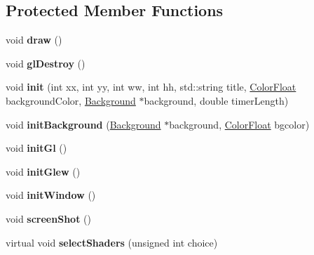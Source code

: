 \subsection*{Protected Member Functions}
\begin{DoxyCompactItemize}
\item 
\mbox{\label{classtsgl_1_1_canvas_af8fd44003f7a8e5cba084ac2a326a7f9}} 
void {\bfseries draw} ()
\item 
\mbox{\label{classtsgl_1_1_canvas_a20304b6428fbe7e163e0a001ea4fdd15}} 
void {\bfseries gl\+Destroy} ()
\item 
\mbox{\label{classtsgl_1_1_canvas_a8a7121a92b6ae93524fc40e65d077d0d}} 
void {\bfseries init} (int xx, int yy, int ww, int hh, std\+::string title, \hyperlink{structtsgl_1_1_color_float}{Color\+Float} background\+Color, \hyperlink{classtsgl_1_1_background}{Background} $\ast$background, double timer\+Length)
\item 
\mbox{\label{classtsgl_1_1_canvas_ae991e0c0d11e8b164c1123eb44163523}} 
void {\bfseries init\+Background} (\hyperlink{classtsgl_1_1_background}{Background} $\ast$background, \hyperlink{structtsgl_1_1_color_float}{Color\+Float} bgcolor)
\item 
\mbox{\label{classtsgl_1_1_canvas_ade2cdb839c67b8ae0331a320bacf2598}} 
void {\bfseries init\+Gl} ()
\item 
\mbox{\label{classtsgl_1_1_canvas_aca33c84be781a4c858577626830819a2}} 
void {\bfseries init\+Glew} ()
\item 
\mbox{\label{classtsgl_1_1_canvas_a18f547a63c4cf3d3ee8c0d7964490450}} 
void {\bfseries init\+Window} ()
\item 
\mbox{\label{classtsgl_1_1_canvas_a33c11fb1b4772d929ca212cc56400fd4}} 
void {\bfseries screen\+Shot} ()
\item 
\mbox{\label{classtsgl_1_1_canvas_a5357ca5aa8d38a8c0811893e45968aa1}} 
virtual void {\bfseries select\+Shaders} (unsigned int choice)
\end{DoxyCompactItemize}
